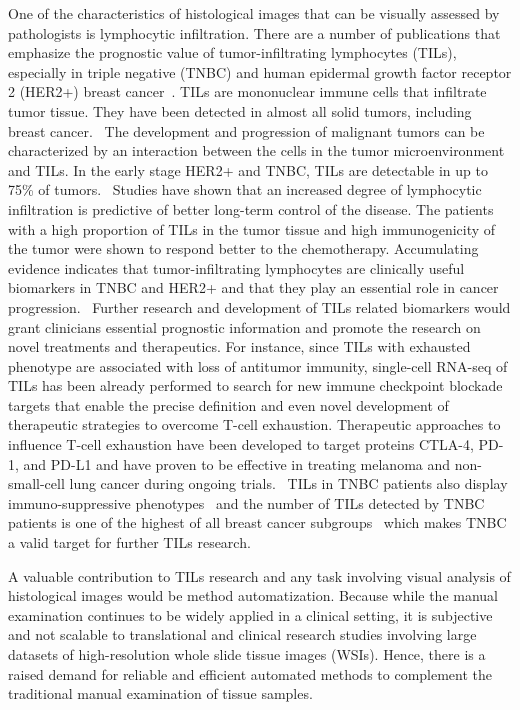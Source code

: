 One of the characteristics of histological images that can be visually assessed by pathologists is lymphocytic infiltration.
There are a number of publications that emphasize the prognostic value of tumor-infiltrating lymphocytes (TILs),
especially in triple negative (TNBC) and human epidermal growth factor receptor 2 (HER2+) breast cancer~\cite*{salgado2015evaluation, denkert2018tumour}.
TILs are mononuclear immune cells that infiltrate tumor tissue.
They have been detected in almost all solid tumors, including breast cancer.~\cite{laenkholm2022incorporation}
The development and progression of malignant tumors can be characterized by an interaction between the cells
in the tumor microenvironment and TILs.
In the early stage HER2+ and TNBC, TILs are detectable in up to 75\% of tumors.~\cite{dieci2018update}
Studies have shown that an increased degree of lymphocytic infiltration is predictive of better
long-term control of the disease.
The patients with a high proportion of TILs in the tumor tissue and high immunogenicity of the tumor were shown
to respond better to the chemotherapy.
Accumulating evidence indicates that tumor-infiltrating lymphocytes are clinically useful biomarkers
in TNBC and HER2+ and that they play an essential role in cancer progression.~\cite{gao2020prognostic}
Further research and development of TILs related biomarkers would grant clinicians
essential prognostic information and promote the research on novel treatments and therapeutics.
For instance, since TILs with exhausted phenotype are associated with loss of antitumor immunity,
single-cell RNA-seq of TILs has been already performed to search for new immune checkpoint blockade
targets that enable the precise definition and even novel development of therapeutic strategies to overcome T-cell exhaustion.
Therapeutic approaches to influence T-cell exhaustion have been developed to target proteins CTLA-4,
PD-1, and PD-L1 and have proven to be effective in treating melanoma and non-small-cell lung cancer
during ongoing trials.~\cite{postow2015immune}
TILs in TNBC patients also display immuno-suppressive phenotypes~\cite{chung2017single} and the number
of TILs detected by TNBC patients is one of the highest of all breast cancer subgroups~\cite{schneeweiss2019diagnosis}
which makes TNBC a valid target for further TILs research.

A valuable contribution to TILs research and any task involving visual analysis
of histological images would be method automatization.
Because while the manual examination continues to be widely applied in a clinical setting,
it is subjective and not scalable to translational and clinical research studies
involving large datasets of high-resolution whole slide tissue images (WSIs).
Hence, there is a raised demand for reliable and efficient automated methods to
complement the traditional manual examination of tissue samples. 


